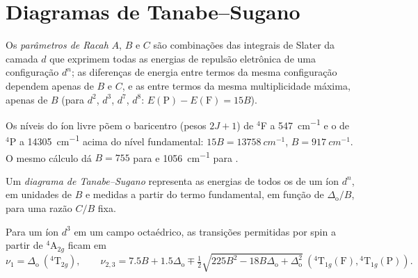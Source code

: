 \section{Diagramas de Tanabe--Sugano}

\begin{definition}\label{def:b3:complex-spectra-magnetism:racah}
Os \emph{parâmetros de Racah} $A$, $B$ e $C$ são combinações das
integrais de Slater da camada $d$ que exprimem todas as energias de repulsão
eletrônica de uma configuração $d^n$; as diferenças de energia entre termos da mesma
configuração dependem apenas de $B$ e $C$, e as entre termos da mesma multiplicidade
máxima, apenas de $B$ (para $d^2$, $d^3$, $d^7$, $d^8$: $E(\mathrm P) - E(\mathrm F) = 15B$).
\end{definition}

\begin{example}\label{ex:b3:complex-spectra-magnetism:free-B}
Os níveis do íon  livre põem o baricentro (pesos $2J + 1$) de $^4$F a
\qty{547}{cm^{-1}} e o de $^4$P a \qty{14305}{cm^{-1}} acima do nível fundamental: $15B = \qty{13758}{cm^{-1}}$,
$B = \qty{917}{cm^{-1}}$. O mesmo cálculo dá $B = 755$ para  e \qty{1056}{cm^{-1}} para
.
\end{example}

\begin{definition}\label{def:b3:complex-spectra-magnetism:tanabe-sugano}
Um \emph{diagrama de Tanabe--Sugano} representa as energias de
todos os  de um íon $d^n$, em unidades de $B$ e medidas a partir
do termo fundamental, em função de $\Delta_{\mathrm o}/B$, para uma razão $C/B$ fixa.
\end{definition}

\begin{proposition}\label{prop:b3:complex-spectra-magnetism:d3-bands}
Para um íon $d^3$ em um campo octaédrico, as transições permitidas por spin a partir de $^4$A$_{2g}$ ficam em
\[
  \nu_1 = \Delta_{\mathrm o}\ (^4\mathrm T_{2g}), \qquad
  \nu_{2,3} = 7.5B + 1.5\Delta_{\mathrm o} \mp \tfrac12\sqrt{225B^2 - 18B\Delta_{\mathrm o} + \Delta_{\mathrm o}^2}\ (^4\mathrm T_{1g}(\mathrm F), {}^4\mathrm T_{1g}(\mathrm P)).
\]
\end{proposition}

